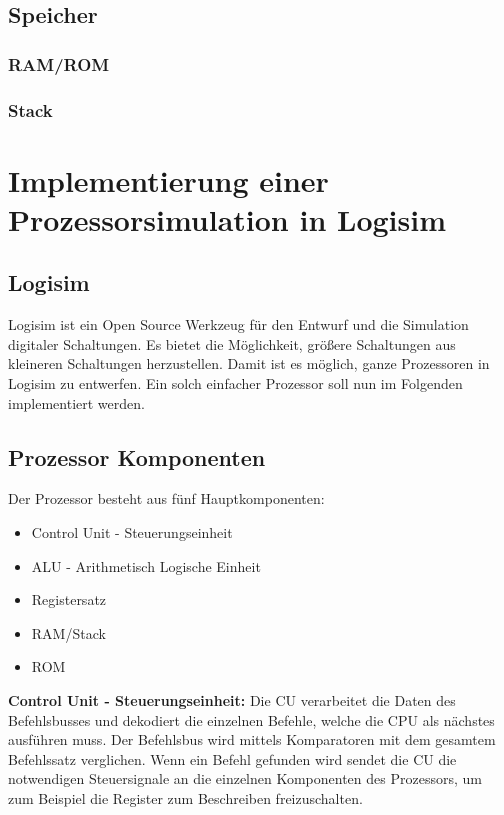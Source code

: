 \documentclass[12pt]{article}
\begin{document}
\subsection{Speicher}

\subsubsection{RAM/ROM}
\subsubsection{Stack}

\section{Implementierung einer Prozessorsimulation in Logisim}
\subsection{Logisim}
Logisim ist ein Open Source Werkzeug für den Entwurf und die Simulation digitaler Schaltungen. Es bietet die Möglichkeit, größere Schaltungen aus kleineren Schaltungen herzustellen. Damit ist es möglich, ganze Prozessoren in Logisim zu entwerfen. Ein solch einfacher Prozessor soll nun im Folgenden implementiert werden.
\subsection{Prozessor Komponenten}
Der Prozessor besteht aus fünf Hauptkomponenten:
\begin{itemize}
\item Control Unit - Steuerungseinheit
\item ALU - Arithmetisch Logische Einheit
\item Registersatz 
\item RAM/Stack
\item ROM
\end{itemize}

\textbf{Control Unit - Steuerungseinheit: } Die CU verarbeitet die Daten des Befehlsbusses und dekodiert die einzelnen Befehle, welche die CPU als nächstes ausführen muss. Der Befehlsbus wird mittels Komparatoren mit dem gesamtem Befehlssatz verglichen. Wenn ein Befehl gefunden wird sendet die CU die notwendigen Steuersignale an die einzelnen Komponenten des Prozessors, um zum Beispiel die Register zum Beschreiben freizuschalten.
\end{document}
